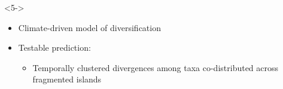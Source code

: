 {\begin{frame}
\begin{columns}
\begin{uncoverenv}
{\begin{minipage}[t][3.6cm][t]{1.1\textwidth}
                \begin{onlyenv}<5->
                \begin{itemize}
                    \item<5-> Climate-driven model of diversification
                    \item<6-> Testable prediction:
                    \begin{itemize}
                        \item Temporally clustered divergences among taxa
                            co-distributed across fragmented islands
                    \end{itemize}
                \end{itemize}
                \end{onlyenv}
            \end{minipage}
        }
    \end{uncoverenv}
    \end{columns}
\end{frame}
}



